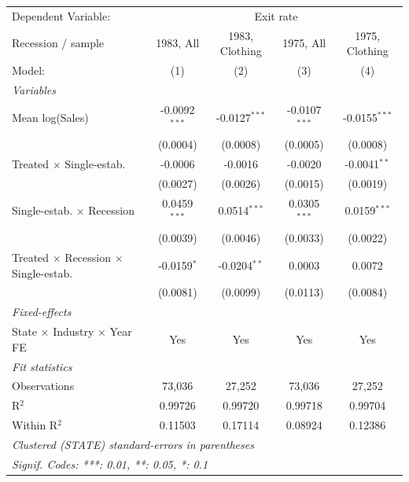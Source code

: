 \begingroup
\centering
\begin{tabular}{lcccc}
   \tabularnewline \midrule \midrule
   Dependent Variable: & \multicolumn{4}{c}{Exit rate}\\
   Recession / sample                                  & 1983, All       & 1983, Clothing  & 1975, All       & 1975, Clothing \\   
   Model:                                              & (1)             & (2)             & (3)             & (4)\\  
   \midrule
   \emph{Variables}\\
   Mean log(Sales)                                     & -0.0092$^{***}$ & -0.0127$^{***}$ & -0.0107$^{***}$ & -0.0155$^{***}$\\   
                                                       & (0.0004)        & (0.0008)        & (0.0005)        & (0.0008)\\   
   Treated $\times$ Single-estab.                      & -0.0006         & -0.0016         & -0.0020         & -0.0041$^{**}$\\   
                                                       & (0.0027)        & (0.0026)        & (0.0015)        & (0.0019)\\   
   Single-estab. $\times$ Recession                    & 0.0459$^{***}$  & 0.0514$^{***}$  & 0.0305$^{***}$  & 0.0159$^{***}$\\   
                                                       & (0.0039)        & (0.0046)        & (0.0033)        & (0.0022)\\   
   Treated $\times$ Recession $\times$ Single-estab.   & -0.0159$^{*}$   & -0.0204$^{**}$  & 0.0003          & 0.0072\\   
                                                       & (0.0081)        & (0.0099)        & (0.0113)        & (0.0084)\\   
   \midrule
   \emph{Fixed-effects}\\
   State $\times$ Industry $\times$ Year FE            & Yes             & Yes             & Yes             & Yes\\  
   \midrule
   \emph{Fit statistics}\\
   Observations                                        & 73,036          & 27,252          & 73,036          & 27,252\\  
   R$^2$                                               & 0.99726         & 0.99720         & 0.99718         & 0.99704\\  
   Within R$^2$                                        & 0.11503         & 0.17114         & 0.08924         & 0.12386\\  
   \midrule \midrule
   \multicolumn{5}{l}{\emph{Clustered (STATE) standard-errors in parentheses}}\\
   \multicolumn{5}{l}{\emph{Signif. Codes: ***: 0.01, **: 0.05, *: 0.1}}\\
\end{tabular}
\par\endgroup
